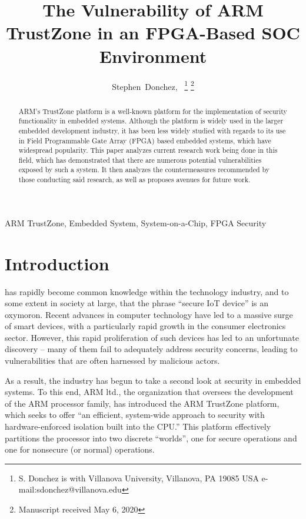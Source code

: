 \documentclass[journal]{IEEEtran}
\begin{document}
\title{The Vulnerability of ARM TrustZone in an FPGA-Based SOC Environment}

\author{Stephen~Donchez,~%
\thanks{S. Donchez is with Villanova University, Villanova, PA 19085 USA 
\mbox{e-mail:sdonchez@villanova.edu}}%
\thanks{Manuscript received May 6, 2020}}%

\maketitle

\begin{abstract}
ARM's TrustZone platform is a well-known platform for the implementation of security
functionality in embedded systems. Although the platform is widely used in the larger
embedded development industry, it has been less widely studied with regards to its use in
Field Programmable Gate Array (FPGA) based embedded systems, which have widespread
popularity. This paper analyzes current research work being done in this field, which has 
demonstrated that there are numerous potential vulnerabilities exposed by such a system.
It then analyzes the countermeasures recommended by those conducting said research, as
well as proposes avenues for future work.
\end{abstract}

\begin{IEEEkeywords}
ARM TrustZone, Embedded System, System-on-a-Chip, FPGA Security
\end{IEEEkeywords}

\section{Introduction} \label{sec:introduction}
 has rapidly become common knowledge within the technology industry, 
and to some extent in society at large, that the phrase “secure IoT device” is an 
oxymoron. Recent advances in computer technology have led to a massive surge of smart 
devices, with a particularly rapid growth in the consumer electronics sector. However, 
this rapid proliferation of such devices has led to an unfortunate discovery – many of 
them fail to adequately address security concerns, leading to vulnerabilities that are 
often harnessed by malicious actors.

As a result, the industry has begun to take a second look at security in embedded systems.
To this end, ARM ltd., the organization that oversees the development of the ARM processor
family, has introduced the ARM TrustZone platform, which seeks to offer ``an efficient, 
system-wide approach to security with hardware-enforced isolation built into the CPU.''
\cite{noauthor_trustzone_nodate} This platform effectively partitions the processor into
two discrete ``worlds'', one for secure operations and one for nonsecure (or normal) 
operations.
\end{document}

